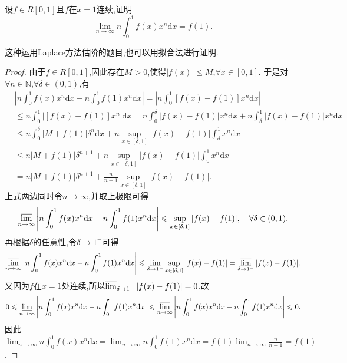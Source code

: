 \documentclass[../../main.tex]{subfiles}%
\begin{document}
\begin{example}\label{example4544166848}
设\(f\in R[0,1]\)且\(f\)在\(x = 1\)连续,证明
\[
\lim_{n \to \infty} n\int_{0}^{1} f(x)x^n \mathrm{d}x = f(1).
\]
\end{example}
\begin{note}
这种运用Laplace方法估阶的题目,也可以用拟合法进行证明.
\end{note}
\begin{proof}
由于\(f\in R[0,1]\),因此存在\(M > 0\),使得\(\vert f(x)\vert\leqslant M\),\(\forall x\in [0,1]\).
于是对\(\forall n\in\mathbb{N}\),\(\forall\delta\in(0,1)\),有
\begin{align*}
&\left\vert n\int_0^1 f(x)x^n \mathrm{d}x - n\int_0^1 f(1)x^n \mathrm{d}x\right\vert=\left\vert n\int_0^1 [f(x) - f(1)]x^n \mathrm{d}x\right\vert\\
&\leqslant n\int_0^1 \vert [f(x) - f(1)]x^n\vert \mathrm{d}x
=n\int_0^{\delta} \vert f(x) - f(1)\vert x^n \mathrm{d}x + n\int_{\delta}^1 \vert f(x) - f(1)\vert x^n \mathrm{d}x\\
&\leqslant n\int_0^{\delta} \vert M + f(1)\vert\delta^n \mathrm{d}x + n\sup_{x\in[\delta,1]}\vert f(x) - f(1)\vert\int_{\delta}^1 x^n \mathrm{d}x\\
&\leqslant n\vert M + f(1)\vert\delta^{n + 1} + n\sup_{x\in[\delta,1]}\vert f(x) - f(1)\vert\int_0^1 x^n \mathrm{d}x\\
&=n\vert M + f(1)\vert\delta^{n + 1} + \frac{n}{n + 1}\sup_{x\in[\delta,1]}\vert f(x) - f(1)\vert.
\end{align*}
上式两边同时令\(n\rightarrow\infty\),并取上极限可得
\[
\varlimsup_{n\rightarrow\infty}\left\vert n\int_0^1 f(x)x^n \mathrm{d}x - n\int_0^1 f(1)x^n \mathrm{d}x\right\vert\leqslant\sup_{x\in[\delta,1]}\vert f(x) - f(1)\vert, \quad\forall\delta\in(0,1).
\]
再根据\(\delta\)的任意性,令\(\delta\rightarrow 1^-\)可得
\[
\varlimsup_{n\rightarrow\infty}\left\vert n\int_0^1 f(x)x^n \mathrm{d}x - n\int_0^1 f(1)x^n \mathrm{d}x\right\vert\leqslant\lim_{\delta\rightarrow 1^-}\sup_{x\in[\delta,1]}\vert f(x) - f(1)\vert=\varlimsup_{\delta\rightarrow 1^-}\vert f(x) - f(1)\vert.
\]
又因为\(f\)在\(x = 1\)处连续,所以\(\varlimsup_{\delta\rightarrow 1^-}\vert f(x) - f(1)\vert = 0\).故
\[
0\leqslant\varliminf_{n\rightarrow\infty}\left\vert n\int_0^1 f(x)x^n \mathrm{d}x - n\int_0^1 f(1)x^n \mathrm{d}x\right\vert\leqslant\varlimsup_{n\rightarrow\infty}\left\vert n\int_0^1 f(x)x^n \mathrm{d}x - n\int_0^1 f(1)x^n \mathrm{d}x\right\vert\leqslant 0.
\]
因此$\lim_{n\rightarrow\infty}n\int_0^1 f(x)x^n \mathrm{d}x=\lim_{n\rightarrow\infty}n\int_0^1 f(1)x^n \mathrm{d}x = f(1)\lim_{n\rightarrow\infty}\frac{n}{n + 1}=f(1)$.
\end{proof}
\end{document}
